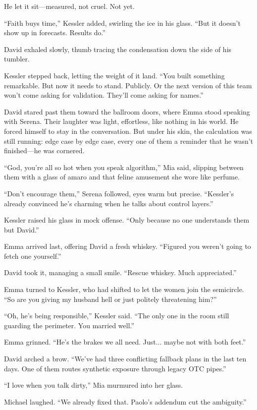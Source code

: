 He let it sit—measured, not cruel. Not yet.

``Faith buys time,'' Kessler added, swirling the ice in his glass. ``But it doesn’t show up in forecasts. 
Results do.''

David exhaled slowly, thumb tracing the condensation down the side of his tumbler.

Kessler stepped back, letting the weight of it land. ``You built something remarkable. But now it needs 
to stand. Publicly. Or the next version of this team won’t come asking for validation. They’ll come 
asking for names.''

David stared past them toward the ballroom doors, where Emma stood speaking with Serena. 
Their laughter was light, effortless, like nothing in his world. He forced himself to stay 
in the conversation. But under his skin, the calculation was still running: edge case by 
edge case, every one of them a reminder that he wasn’t finished—he was cornered.

``God, you’re all so hot when you speak algorithm,'' Mia said, slipping between them with a 
glass of amaro 
and that feline amusement she wore like perfume.

``Don’t encourage them,'' Serena followed, eyes warm but precise. ``Kessler’s already convinced he’s 
charming when he talks about control layers.''

Kessler raised his glass in mock offense. ``Only because no one understands them but David.''

Emma arrived last, offering David a fresh whiskey. ``Figured you weren’t going to fetch one yourself.''

David took it, managing a small smile. ``Rescue whiskey. Much appreciated.''

Emma turned to Kessler, who had shifted to let the women join the semicircle. ``So are you giving my 
husband hell or just politely threatening him?''

``Oh, he’s being responsible,'' Kessler said. ``The only one in the room still guarding the perimeter. 
You married well.''

Emma grinned. ``He’s the brakes we all need. Just... maybe not with both feet.''

David arched a brow. ``We’ve had three conflicting fallback plans in the last ten days. One of them 
routes synthetic exposure through legacy OTC pipes.''

``I love when you talk dirty,'' Mia murmured into her glass.

Michael laughed. ``We already fixed that. Paolo’s addendum cut the ambiguity.''

